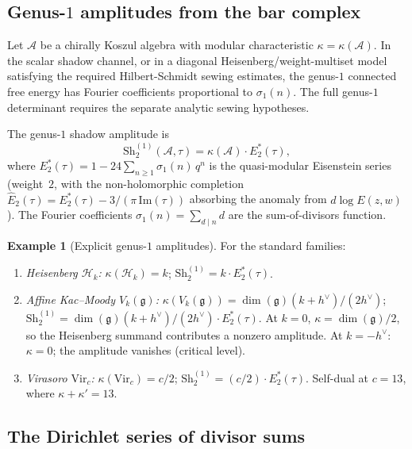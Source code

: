 \documentclass[11pt,reqno]{amsart}
\theoremstyle{definition}
\newtheorem{example}[theorem]{Example}
\theoremstyle{remark}
\providecommand{\cA}{\mathcal{A}}
\providecommand{\cH}{\mathcal{H}}
\providecommand{\fg}{\mathfrak{g}}
\providecommand{\Vir}{\mathrm{Vir}}
\numberwithin{equation}{section}
\begin{document}
\subsection{Genus-$1$ amplitudes from the bar complex}

Let $\cA$ be a chirally Koszul algebra with modular characteristic
$\kappa = \kappa(\cA)$. In the scalar shadow channel, or in a
diagonal Heisenberg/weight-multiset model satisfying the required
Hilbert-Schmidt sewing estimates, the genus-$1$ connected free
energy has Fourier coefficients proportional to $\sigma_1(n)$. The
full genus-$1$ determinant requires the separate analytic sewing
hypotheses.

The genus-$1$ shadow amplitude is
\begin{equation}\label{eq:Sh2}
  \mathrm{Sh}_2^{(1)}(\cA, \tau)
  = \kappa(\cA) \cdot E_2^*(\tau),
\end{equation}
where $E_2^*(\tau) = 1 - 24\sum_{n \ge 1}\sigma_1(n)\,q^n$ is the
quasi-modular Eisenstein series (weight~$2$, with the non-holomorphic
completion $\hat E_2(\tau) = E_2^*(\tau) - 3/(\pi\,\mathrm{Im}(\tau))$
absorbing the anomaly from $d\log E(z,w)$). The Fourier coefficients
$\sigma_1(n) = \sum_{d \mid n} d$ are the sum-of-divisors function.

\begin{example}[Explicit genus-$1$ amplitudes]\label{ex:genus1-families}
  For the standard families:
  \begin{enumerate}[label=\textup{(\alph*)}]
  \item \emph{Heisenberg $\cH_k$:}
    $\kappa(\cH_k) = k$;
    $\mathrm{Sh}_2^{(1)} = k \cdot E_2^*(\tau)$.
  \item \emph{Affine Kac--Moody $V_k(\fg)$:}
    $\kappa(V_k(\fg)) = \dim(\fg)(k + h^\vee)/(2h^\vee)$;
    $\mathrm{Sh}_2^{(1)} = \dim(\fg)(k{+}h^\vee)/(2h^\vee)
    \cdot E_2^*(\tau)$.
    At $k = 0$, $\kappa = \dim(\fg)/2$, so the Heisenberg summand
    contributes a nonzero amplitude.
    At $k = -h^\vee$: $\kappa = 0$; the amplitude vanishes (critical
    level).
  \item \emph{Virasoro $\Vir_c$:}
    $\kappa(\Vir_c) = c/2$;
    $\mathrm{Sh}_2^{(1)} = (c/2) \cdot E_2^*(\tau)$.
    Self-dual at $c = 13$, where $\kappa + \kappa' = 13$.
  \end{enumerate}
\end{example}

\subsection{The Dirichlet series of divisor sums}
\end{document}
